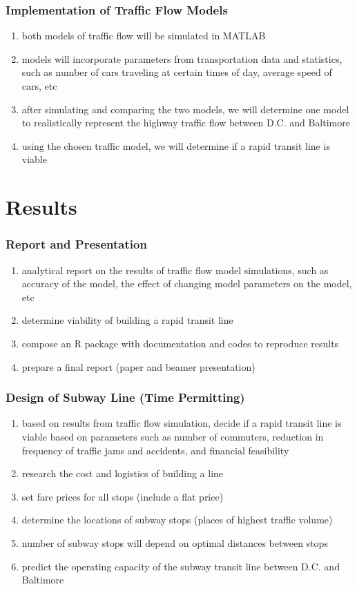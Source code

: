 \documentclass[compress,handout,10pt]{beamer}
\let\olditem\item
\renewcommand{\item}{\setlength{\itemsep}{0.5\baselineskip}\olditem}
\begin{document}
\begin{frame}
    \frametitle{Implementation of Traffic Flow Models}
     \begin{enumerate}
	\item both models of traffic flow will be simulated in MATLAB
	\item models will incorporate parameters from transportation data and statistics, such as number of cars traveling at certain times of day, average speed of cars, etc
	\item after simulating and comparing the two models, we will determine one model to realistically represent the highway traffic flow between D.C. and Baltimore
	\item using the chosen traffic model, we will determine if a rapid transit line is viable
     \end{enumerate}
\end{frame}

\section{Results}

\begin{frame}
    \frametitle{Report and Presentation}
     \begin{enumerate}
	\item analytical report on the results of traffic flow model simulations, such as accuracy of the model, the effect of changing model parameters on the model, etc
	\item determine viability of building a rapid transit line
	\item compose an R package with documentation and codes to reproduce results
	\item prepare a final report (paper and beamer presentation)
     \end{enumerate}
\end{frame}

\begin{frame}
    \frametitle{Design of Subway Line (Time Permitting)}
     \begin{enumerate}
	\item based on results from traffic flow simulation, decide if a rapid transit line is viable based on parameters such as number of commuters, reduction in frequency of traffic jams and accidents, and financial feasibility
	\item research the cost and logistics of building a line
	\item set fare prices for all stops (include a flat price)
	\item determine the locations of subway stops (places of highest traffic volume)
	\item number of subway stops will depend on optimal distances between stops
	\item predict the operating capacity of the subway transit line between D.C. and Baltimore
     \end{enumerate}
\end{frame}
\end{document}
